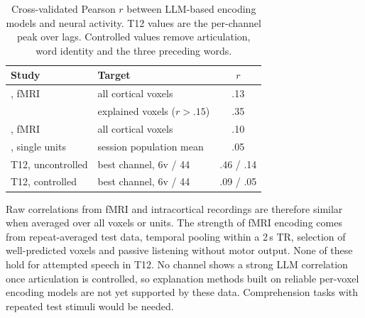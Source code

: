 \documentclass[11pt]{article}
\begin{document}
\begin{table}[h]
\centering
\begin{tabular}{llc}
\toprule
Study & Target & $r$ \\
\midrule
\citet{antonello2024generative}, fMRI & all cortical voxels & .13 \\
 & explained voxels ($r>.15$) & .35 \\
\citet{singh2025evaluating}, fMRI & all cortical voxels & .10 \\
\citet{cai2026language}, single units & session population mean & .05 \\
T12, uncontrolled & best channel, 6v / 44 & .46 / .14 \\
T12, controlled & best channel, 6v / 44 & .09 / .05 \\
\bottomrule
\end{tabular}
\caption{Cross-validated Pearson $r$ between LLM-based encoding models and neural activity. T12 values are the per-channel peak over lags. Controlled values remove articulation, word identity and the three preceding words.}
\label{tab:compare}
\end{table}

Raw correlations from fMRI and intracortical recordings are therefore similar when averaged over all voxels or units. The strength of fMRI encoding comes from repeat-averaged test data, temporal pooling within a 2\,s TR, selection of well-predicted voxels and passive listening without motor output. None of these hold for attempted speech in T12. No channel shows a strong LLM correlation once articulation is controlled, so explanation methods built on reliable per-voxel encoding models \cite{antonello2024generative} are not yet supported by these data. Comprehension tasks with repeated test stimuli would be needed.



\end{document}
